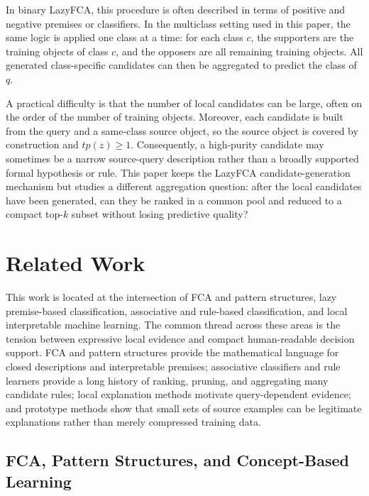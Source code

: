 \documentclass[11pt]{article}
\begin{document}
In binary LazyFCA, this procedure is often described in terms of positive and
negative premises or classifiers. In the multiclass setting used in this paper, the same
logic is applied one class at a time: for each class $c$, the supporters are
the training objects of class $c$, and the opposers are all remaining training
objects. All generated class-specific candidates can then be aggregated to
predict the class of $q$.

A practical difficulty is that the number of local candidates can be large,
often on the order of the number of training objects. Moreover, each candidate
is built from the query and a same-class source object, so the source object is
covered by construction and $tp(z) \geq 1$. Consequently, a high-purity
candidate may sometimes be a narrow source-query description rather than a
broadly supported formal hypothesis or rule. This paper keeps the LazyFCA
candidate-generation mechanism but studies a different aggregation question:
after the local candidates have been generated, can they be ranked in a common pool and
reduced to a compact top-$k$ subset without losing predictive quality?

\section{Related Work}

This work is located at the intersection of FCA and pattern structures,
lazy premise-based classification, associative and rule-based classification,
and local interpretable machine learning. The common thread across these
areas is the tension between expressive local evidence and compact
human-readable decision support. FCA and pattern structures provide the
mathematical language for closed descriptions and interpretable premises;
associative classifiers and rule learners provide a long history of ranking,
pruning, and aggregating many candidate rules; local explanation methods
motivate query-dependent evidence; and prototype methods show that small sets
of source examples can be legitimate explanations rather than merely
compressed training data.

\subsection{FCA, Pattern Structures, and Concept-Based Learning}
\end{document}
